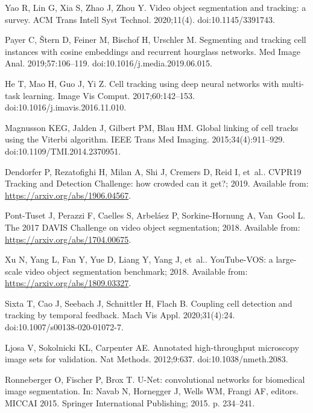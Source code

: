 \documentclass[10pt,letterpaper]{article}
\begin{document}
\begin{thebibliography}{10}
Yao R, Lin G, Xia S, Zhao J, Zhou Y.
\newblock Video object segmentation and tracking: a survey.
\newblock ACM Trans Intell Syst Technol. 2020;11(4).
\newblock doi:{10.1145/3391743}.

Payer C, Štern D, Feiner M, Bischof H, Urschler M.
\newblock Segmenting and tracking cell instances with cosine embeddings and
  recurrent hourglass networks.
\newblock Med Image Anal. 2019;57:106--119.
\newblock doi:{10.1016/j.media.2019.06.015}.

He T, Mao H, Guo J, Yi Z.
\newblock Cell tracking using deep neural networks with multi-task learning.
\newblock Image Vis Comput. 2017;60:142--153.
\newblock doi:{10.1016/j.imavis.2016.11.010}.

Magnusson KEG, Jalden J, Gilbert PM, Blau HM.
\newblock Global linking of cell tracks using the Viterbi algorithm.
\newblock IEEE Trans Med Imaging. 2015;34(4):911--929.
\newblock doi:{10.1109/TMI.2014.2370951}.

Dendorfer P, Rezatofighi H, Milan A, Shi J, Cremers D, Reid I, et~al.. CVPR19
  Tracking and Detection Challenge: how crowded can it get?; 2019.
\newblock Available from: \url{https://arxiv.org/abs/1906.04567}.

Pont-Tuset J, Perazzi F, Caelles S, Arbeláez P, Sorkine-Hornung A, Van~Gool L.
  The 2017 DAVIS Challenge on video object segmentation; 2018.
\newblock Available from: \url{https://arxiv.org/abs/1704.00675}.

Xu N, Yang L, Fan Y, Yue D, Liang Y, Yang J, et~al.. YouTube-VOS: a large-scale
  video object segmentation benchmark; 2018.
\newblock Available from: \url{https://arxiv.org/abs/1809.03327}.

Sixta T, Cao J, Seebach J, Schnittler H, Flach B.
\newblock Coupling cell detection and tracking by temporal feedback.
\newblock Mach Vis Appl. 2020;31(4):24.
\newblock doi:{10.1007/s00138-020-01072-7}.

Ljosa V, Sokolnicki KL, Carpenter AE.
\newblock Annotated high-throughput microscopy image sets for validation.
\newblock Nat Methods. 2012;9:637.
\newblock doi:{10.1038/nmeth.2083}.

Ronneberger O, Fischer P, Brox T.
\newblock U-{N}et: convolutional networks for biomedical image segmentation.
\newblock In: Navab N, Hornegger J, Wells WM, Frangi AF, editors. MICCAI 2015.
  Springer International Publishing; 2015. p. 234--241.


\end{thebibliography}
\end{document}
